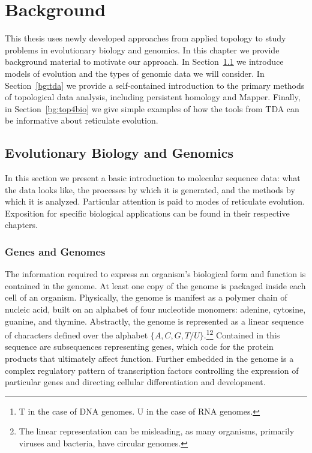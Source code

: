 \chapter{Background}
\label{ch:background}

This thesis uses newly developed approaches from applied topology to study problems in evolutionary biology and genomics.
In this chapter we provide background material to motivate our approach.
In Section~\ref{bg:bio} we introduce models of evolution and the types of genomic data we will consider.
In Section~\ref{bg:tda} we provide a self-contained introduction to the primary methods of topological data analysis, including persistent homology and Mapper.
Finally, in Section~\ref{bg:top4bio} we give simple examples of how the tools from TDA can be informative about reticulate evolution.

\section{Evolutionary Biology and Genomics}
\label{bg:bio}

In this section we present a basic introduction to molecular sequence data: what the data looks like, the processes by which it is generated, and the methods by which it is analyzed.
Particular attention is paid to modes of reticulate evolution.
Exposition for specific biological applications can be found in their respective chapters.

\subsection{Genes and Genomes}
\label{bg:bio:genes}

The information required to express an organism's biological form and function is contained in the genome.
At least one copy of the genome is packaged inside each cell of an organism.
Physically, the genome is manifest as a polymer chain of nucleic acid, built on an alphabet of four nucleotide monomers: adenine, cytosine, guanine, and thymine.
Abstractly, the genome is represented as a linear sequence of characters defined over the alphabet $\{A,C,G,T/U\}$.\footnote{T in the case of DNA genomes. U in the case of RNA genomes.}\footnote{The linear representation can be misleading, as many organisms, primarily viruses and bacteria, have circular genomes.}
Contained in this sequence are subsequences representing genes, which code for the protein products that ultimately affect function.
Further embedded in the genome is a complex regulatory pattern of transcription factors controlling the expression of particular genes and directing cellular differentiation and development.

